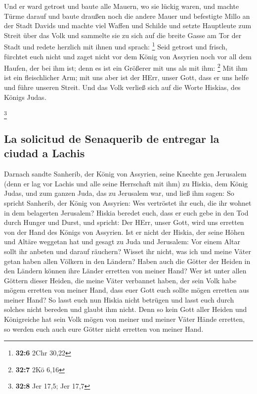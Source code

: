  Und er ward getrost und baute alle Mauern, wo sie lückig
waren, und machte Türme darauf und baute draußen noch die andere Mauer
und befestigte Millo an der Stadt Davids und machte viel Waffen und
Schilde  und setzte Hauptleute zum Streit über das Volk
und sammelte sie zu sich auf die breite Gasse am Tor der Stadt und
redete herzlich mit ihnen und sprach: \footnote{\textbf{32:6} 2Chr 30,22}
 Seid getrost und frisch, fürchtet euch nicht und zaget
nicht vor dem König von Assyrien noch vor all dem Haufen, der bei ihm
ist; denn es ist ein Größerer mit uns als mit ihm: \footnote{\textbf{32:7}
  2Kö 6,16}  Mit ihm ist ein fleischlicher Arm; mit uns
aber ist der HErr, unser Gott, dass er uns helfe und führe unseren
Streit. Und das Volk verließ sich auf die Worte Hiskias, des Königs
Judas.

\footnote{\textbf{32:8} Jer 17,5; Jer 17,7}

\hypertarget{la-solicitud-de-senaquerib-de-entregar-la-ciudad-a-lachis}{%
\subsection{La solicitud de Senaquerib de entregar la ciudad a
Lachis}\label{la-solicitud-de-senaquerib-de-entregar-la-ciudad-a-lachis}}

 Darnach sandte Sanherib, der König von Assyrien, seine
Knechte gen Jerusalem (denn er lag vor Lachis und alle seine Herrschaft
mit ihm) zu Hiskia, dem König Judas, und zum ganzen Juda, das zu
Jerusalem war, und ließ ihm sagen:  So spricht Sanherib,
der König von Assyrien: Wes vertröstet ihr euch, die ihr wohnet in dem
belagerten Jerusalem?  Hiskia beredet euch, dass er euch
gebe in den Tod durch Hunger und Durst, und spricht: Der HErr, unser
Gott, wird uns erretten von der Hand des Königs von Assyrien.
 Ist er nicht der Hiskia, der seine Höhen und Altäre
weggetan hat und gesagt zu Juda und Jerusalem: Vor einem Altar sollt ihr
anbeten und darauf räuchern?  Wisset ihr nicht, was ich
und meine Väter getan haben allen Völkern in den Ländern? Haben auch die
Götter der Heiden in den Ländern können ihre Länder erretten von meiner
Hand?  Wer ist unter allen Göttern dieser Heiden, die
meine Väter verbannet haben, der sein Volk habe mögem erretten von
meiner Hand, dass euer Gott euch sollte mögen erretten aus meiner Hand?
 So lasst euch nun Hiskia nicht betrügen und lasst euch
durch solches nicht bereden und glaubt ihm nicht. Denn so kein Gott
aller Heiden und Königreiche hat sein Volk mögen von meiner und meiner
Väter Hände erretten, so werden euch auch eure Götter nicht erretten von
meiner Hand.

